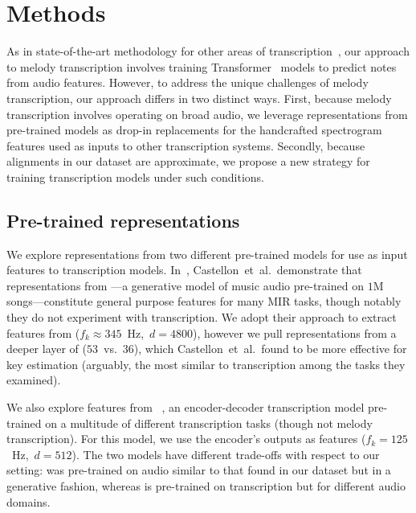 \section{Methods}

As in state-of-the-art methodology for other areas of transcription~\cite{hawthorne2021sequence}, 
our approach to melody transcription involves training Transformer~\cite{vaswani2017attention} models to predict notes from audio features. 
However, to address the unique challenges of melody transcription, our approach differs in two distinct ways. 
First, because melody transcription involves operating on broad audio, we leverage representations from pre-trained models as drop-in replacements for the handcrafted spectrogram features used as inputs to other transcription systems. 
Secondly, because alignments in our dataset are approximate, we propose a new strategy for training transcription models under such conditions.

\subsection{Pre-trained representations}
\label{sec:representations}

We explore representations from two different pre-trained models for use as input features to transcription models.
In~\cite{castellon2021calm}, Castellon~et~al.\ demonstrate that representations from \jukebox---a generative model of music audio pre-trained on $1$M songs---constitute general purpose features for many MIR tasks, though notably they do not experiment with transcription. 
We adopt their approach to extract features from \jukebox{} (${f_k \approx 345}$~Hz,~${d = 4800}$), however we pull representations from a deeper layer of \jukebox{} ($53$~vs.~$36$), which Castellon~et~al.\ found to be more effective for key estimation (arguably, the most similar to transcription among the tasks they examined).

We also explore features from \mtthree~\cite{gardner2021mt3}, an encoder-decoder transcription model pre-trained on a multitude of different transcription tasks (though not melody transcription). 
For this model, we use the encoder's outputs as features (${f_k = 125}$~Hz,~${d = 512}$). 
The two models have different trade-offs with respect to our setting: \jukebox{} was pre-trained on audio similar to that found in our dataset but in a generative fashion, 
whereas \mtthree{} is pre-trained on transcription but for different audio domains. 

